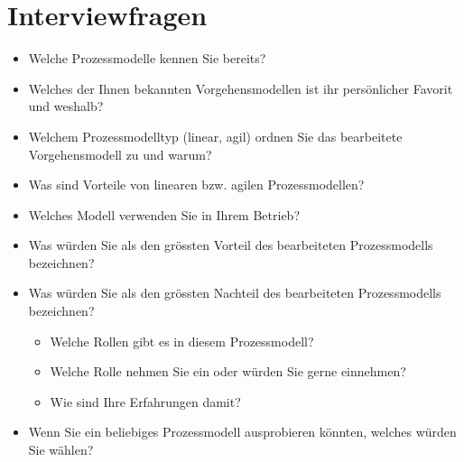 \chapter{Interviewfragen}
\thispagestyle{fancy}

\begin{itemize}
\item Welche Prozessmodelle kennen Sie bereits?
\item Welches der Ihnen bekannten Vorgehensmodellen ist ihr persönlicher Favorit und weshalb?
\item Welchem Prozessmodelltyp (linear, agil) ordnen Sie das bearbeitete Vorgehensmodell zu und warum?
\item Was sind Vorteile von linearen bzw. agilen Prozessmodellen?
\item Welches Modell verwenden Sie in Ihrem Betrieb?
\item Was würden Sie als den grössten Vorteil des bearbeiteten Prozessmodells bezeichnen?
\item Was würden Sie als den grössten Nachteil des bearbeiteten Prozessmodells bezeichnen?
\begin{itemize}
         \item Welche Rollen gibt es in diesem Prozessmodell?
         \item Welche Rolle nehmen Sie ein oder würden Sie gerne einnehmen?
         \item Wie sind Ihre Erfahrungen damit?
\end{itemize}

\item Wenn Sie ein beliebiges Prozessmodell ausprobieren könnten, welches würden Sie wählen?
\end{itemize}